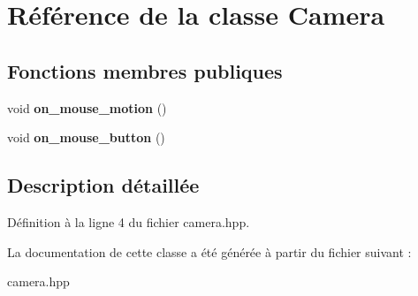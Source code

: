 \hypertarget{classCamera}{\section{Référence de la classe Camera}
\label{classCamera}
}
\subsection*{Fonctions membres publiques}
\begin{DoxyCompactItemize}
\item 
\hypertarget{classCamera_acec7dc4db0d4688eae61d5698515d3df}{void {\bfseries on\+\_\+mouse\+\_\+motion} ()}\label{classCamera_acec7dc4db0d4688eae61d5698515d3df}

\item 
\hypertarget{classCamera_a3cd76aad92142084f0f97a75caaf53bd}{void {\bfseries on\+\_\+mouse\+\_\+button} ()}\label{classCamera_a3cd76aad92142084f0f97a75caaf53bd}

\end{DoxyCompactItemize}


\subsection{Description détaillée}


Définition à la ligne 4 du fichier camera.\+hpp.



La documentation de cette classe a été générée à partir du fichier suivant \+:\begin{DoxyCompactItemize}
\item 
camera.\+hpp\end{DoxyCompactItemize}
